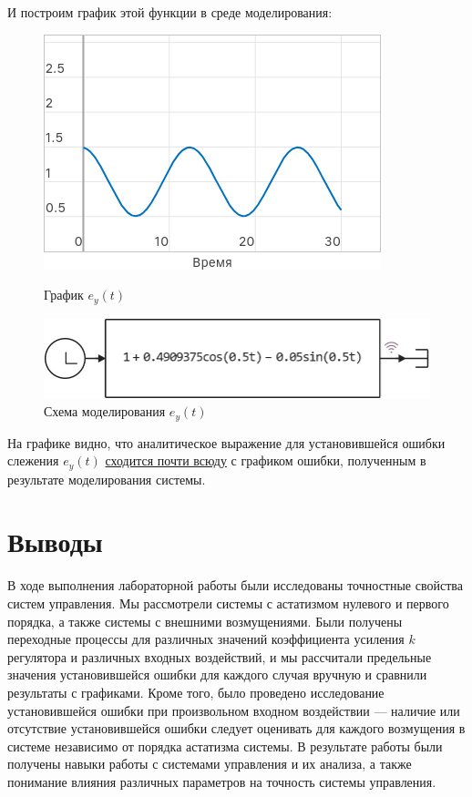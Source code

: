 \documentclass[a4paper]{article}
\newcommand{\addsection}[1]{
    \phantomsection
    \addcontentsline{toc}{section}{#1}
    \section*{\centering #1}
}
\begin{document}
И построим график этой функции в среде моделирования:
\begin{figure}[H]
    \centering
    \begin{minipage}{0.4\textwidth}
        \includegraphics[width=\textwidth]{sources/task4_e_graphics.png}
        \caption*{\centering График $e_y(t)$}
    \end{minipage}
    \hspace{2em}
    \begin{minipage}{0.4\textwidth}
        \includegraphics[width=\textwidth]{sources/task4_e_model.png}
        \caption*{\centering Схема моделирования $e_y(t)$}
    \end{minipage}
\end{figure}
На графике видно, что аналитическое выражение для установившейся ошибки слежения $e_y(t)$ \href{https://ru.wikipedia.org/wiki/Сходимость_почти_всюду}{сходится почти всюду} с графиком ошибки, полученным в результате моделирования системы.

\addsection{Выводы}
В ходе выполнения лабораторной работы были исследованы точностные свойства систем управления. Мы рассмотрели системы с астатизмом нулевого и первого порядка, а также системы с внешними возмущениями. Были получены переходные процессы для различных значений коэффициента усиления $k$ регулятора и различных входных воздействий, и мы рассчитали предельные значения установившейся ошибки для каждого случая вручную и сравнили результаты с графиками. Кроме того, было проведено исследование установившейся ошибки при произвольном входном воздействии --- наличие или отсутствие установившейся ошибки следует оценивать для каждого возмущения в системе независимо от порядка астатизма системы. В результате работы были получены навыки работы с системами управления и их анализа, а также понимание влияния различных параметров на точность системы управления.
\end{document}
